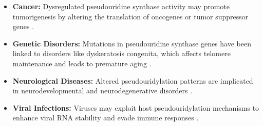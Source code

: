     \begin{itemize}
      \item \textbf{Cancer:} Dysregulated pseudouridine synthase activity may promote tumorigenesis by altering the translation of oncogenes or tumor suppressor genes \cite{ramamurthy2020role}.
      \item \textbf{Genetic Disorders:} Mutations in pseudouridine synthase genes have been linked to disorders like dyskeratosis congenita, which affects telomere maintenance and leads to premature aging \cite{mason2008dyskeratosis}.
      \item \textbf{Neurological Diseases:} Altered pseudouridylation patterns are implicated in neurodevelopmental and neurodegenerative disorders \cite{havelund2017pseudouridine}.
      \item \textbf{Viral Infections:} Viruses may exploit host pseudouridylation mechanisms to enhance viral RNA stability and evade immune responses \cite{karijolich2015viral}.
    \end{itemize}

